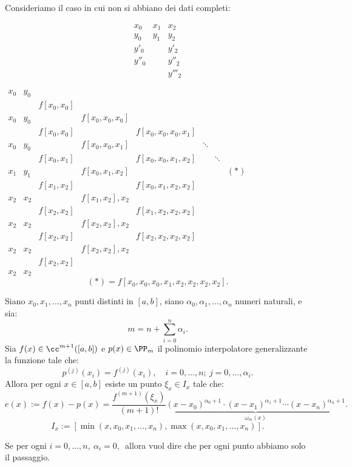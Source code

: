 \begin{exe}
Consideriamo il caso in cui non si abbiano dei dati completi:

\[\begin{array}{lllc}
x_0 & x_1  & x_2  \\
y_0 & y_1 & y_2 \\
y'_0 &   & y'_2 \\
y''_0 & & y''_2 \\
 & & y'''_2
\end{array}\]
\begin{flushleft}
$
\begin{array}{llllllll}
x_0 & y_0  \\
    &     & f[x_0,x_0]  \\
x_0 & y_0 &  & f[x_0,x_0,x_0] \\
    &     & f[x_0,x_0] &   & f[x_0,x_0,x_0,x_1] \\
x_0 & y_0 &  & f[x_0,x_0,x_1] & & \ddots \\
    &     & f[x_0,x_1] &   & f[x_0,x_0,x_1,x_2]  & & \ddots\\
x_1 & y_1 &  & f[x_0,x_1,x_2]  & & & & (*)\\
    &    & f[x_1,x_2] &   & f[x_0,x_1,x_2,x_2] \\
x_2 & x_2 & & f[x_1,x_2],x_2\\
   &    & f[x_2,x_2] & & f[x_1,x_2,x_2,x_2]\\
x_2 & x_2 & & f[x_2,x_2],x_2 & & \\
   &    & f[x_2,x_2] & & f[x_2,x_2,x_2,x_2]\\
x_2 & x_2 & & f[x_2,x_2],x_2\\
   &    & f[x_2,x_2] \\
x_2 & x_2
\end{array}
$
\[(*) = f[x_0,x_0,x_0,x_1,x_2,x_2,x_2,x_2].\]
\end{flushleft}
\end{exe}
\newpage
\begin{teo}
Siano $x_0, x_1, \ldots, x_n$ punti distinti in $[a,b]$, siano $\alpha_0,
\alpha_1, \ldots, \alpha_n$ numeri naturali, e sia:
\[m = n + \sum_{i=0}^n\alpha_i.\]
Sia $f(x) \in \cc^{m+1}([a,b])$ e $p(x) \in \PP_m$ il polinomio interpolatore
generalizzante la funzione tale che:
\[
p^{(j)}(x_i) = f^{(j)}(x_i), \quad i = 0, \ldots, n; \ j= 0, \ldots, \alpha_i.
\]
Allora per ogni $x \in [a,b]$ esiste un punto $\xi_x \in I_x$ tale che:
\[e(x) := f(x)-p(x) = \frac{f^{(m+1)}(\xi_x)}{(m+1)!}
\underbrace{(x-x_0)^{\alpha_0+1}
\cdot (x-x_1)^{\alpha_1+1} \cdots (x-x_n)^{\alpha_n+1}}_{\omega_m(x)}.\]
\[I_x := [\min(x,x_0,x_1, \ldots, x_n), \max(x,x_0,x_1, \ldots, x_n)].\]
\end{teo}
\begin{osse}
Se per ogni $i = 0,\ldots, n, \ \alpha_i = 0,\, $ allora vuol dire che per
ogni punto abbiamo solo il passaggio.
\end{osse}

